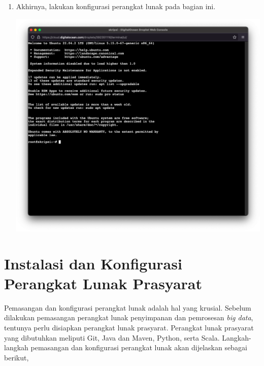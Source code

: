 \begin{enumerate}
\begin{center}
	\end{center} 
  \item Akhirnya, lakukan konfigurasi perangkat lunak pada bagian ini.
	\begin{center}
	\includegraphics[width=1\linewidth]{figures/ch99/ap1/6.png}
	\end{center} 

\end{enumerate}



\chapter{Instalasi dan Konfigurasi Perangkat Lunak Prasyarat}
\label{appendix:B}

Pemasangan dan konfigurasi perangkat lunak adalah hal yang krusial. Sebelum dilakukan pemasangan perangkat lunak penyimpanan dan pemrosesan \textit{big data}, tentunya perlu disiapkan perangkat lunak prasyarat. Perangkat lunak prasyarat yang dibutuhkan meliputi Git, Java dan Maven, Python, serta Scala. Langkah-langkah pemasangan dan konfigurasi perangkat lunak akan dijelaskan sebagai berikut,

